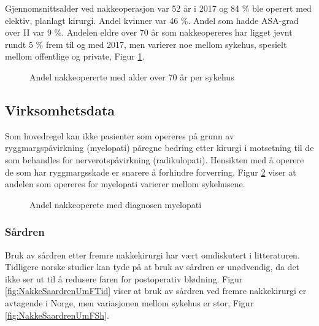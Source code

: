 \documentclass [norsk,a4paper,twoside]{article}\usepackage[]{graphicx}\usepackage[]{color}
\begin{document}
Gjennomsnittsalder ved nakkeoperasjon var 52 år i 2017 og 84 \% ble operert med elektiv, planlagt kirurgi. Andel kvinner var  46 \%.
Andel som hadde ASA-grad over II var 9 \%. Andelen eldre over 70 år som nakkeopereres har ligget jevnt 
rundt 5 \% frem til og med 2017, men varierer noe mellom sykehus, spesielt mellom offentlige og private, 
Figur \ref{fig:NakkeAlder70Sh}.


\begin{figure}[ht]
\caption{\label{fig:NakkeAlder70Sh} Andel nakkeopererte med alder over 70 år per sykehus}
\end{figure}

\clearpage

\subsection{Virksomhetsdata}

Som hovedregel kan ikke pasienter som opereres på grunn av ryggmargspåvirkning (myelopati) påregne bedring etter kirurgi i motsetning til de som behandles for nerverotspåvirkning (radikulopati). Hensikten med å operere de som har ryggmargsskade er snarere å forhindre forverring. Figur \ref{fig:NakkeOprIndikMyelopatiSh} viser at andelen som opereres for myelopati varierer mellom sykehusene.

\begin{figure}[ht]
\caption{\label{fig:NakkeOprIndikMyelopatiSh} Andel nakkeoperete med diagnosen myelopati}
\end{figure}




\clearpage

\subsubsection{Sårdren}

Bruk av sårdren etter fremre nakkekirurgi har vært omdiskutert i litteraturen. Tidligere norske studier kan tyde på at bruk av sårdren er unødvendig, da det ikke ser ut til å redusere faren for postoperativ blødning. Figur \ref{fig:NakkeSaardrenUmFTid} viser at bruk av sårdren ved fremre nakkekirurgi er avtagende i Norge, men variasjonen mellom sykehus er stor, Figur \ref{fig:NakkeSaardrenUmFSh}.
\end{document}
